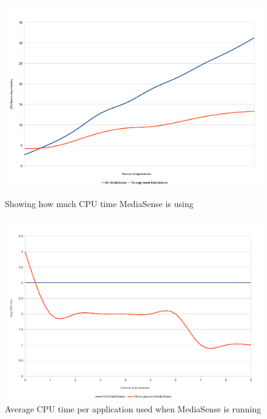 \begin{figure}[H]
		\centering
    	\includegraphics[scale=0.50]{part_7/test_results/cputime.pdf}
    	\caption{Showing how much CPU time MediaSense is using}
    	\includegraphics[scale=0.50]{part_7/test_results/avg_cputime.pdf}
    	\caption{Average CPU time per application used when MediaSense is running}
\end{figure}



